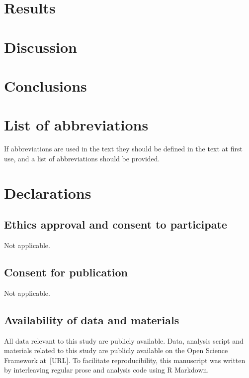 \documentclass[
  letterpaper,
  DIV=11,
  numbers=noendperiod]{scrartcl}
\begin{document}
\section{Results}\label{results}

\section{Discussion}\label{discussion}

\section{Conclusions}\label{conclusions}

\section{List of abbreviations}\label{list-of-abbreviations}

If abbreviations are used in the text they should be defined in the text
at first use, and a list of abbreviations should be provided.

\section{Declarations}\label{declarations}

\subsection{Ethics approval and consent to
participate}\label{ethics-approval-and-consent-to-participate}

Not applicable.

\subsection{Consent for publication}\label{consent-for-publication}

Not applicable.

\subsection{Availability of data and
materials}\label{availability-of-data-and-materials}

All data relevant to this study are publicly available. Data, analysis
script and materials related to this study are publicly available on the
Open Science Framework at~{[}URL{]}. To facilitate reproducibility, this
manuscript was written by interleaving regular prose and analysis code
using R Markdown.
\end{document}
